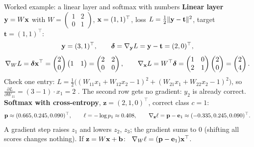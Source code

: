 \documentclass[aspectratio=1610,11pt]{beamer}
\begin{document}
\begin{frame}{Worked example: a linear layer and softmax with numbers}
    \small
    \textbf{Linear layer} $\mathbf{y} = W\mathbf{x}$ with $W = \begin{pmatrix} 1 & 2 \\ 0 & 1 \end{pmatrix}$, $\mathbf{x} = (1, 1)^\top$, loss $L = \frac{1}{2}\lVert \mathbf{y} - \mathbf{t} \rVert^2$, target $\mathbf{t} = (1, 1)^\top$:
    \[\mathbf{y} = (3, 1)^\top, \qquad \boldsymbol{\delta} = \nabla_{\mathbf{y}}L = \mathbf{y} - \mathbf{t} = (2, 0)^\top,\]
    \[\nabla_WL = \boldsymbol{\delta}\mathbf{x}^\top = \begin{pmatrix} 2 \\ 0 \end{pmatrix}\begin{pmatrix} 1 & 1 \end{pmatrix} = \begin{pmatrix} 2 & 2 \\ 0 & 0 \end{pmatrix}, \qquad \nabla_{\mathbf{x}}L = W^\top\boldsymbol{\delta} = \begin{pmatrix} 1 & 0 \\ 2 & 1 \end{pmatrix}\begin{pmatrix} 2 \\ 0 \end{pmatrix} = \begin{pmatrix} 2 \\ 4 \end{pmatrix}.\]
    Check one entry: $L = \frac{1}{2}\big((W_{11}x_1 + W_{12}x_2 - 1)^2 + (W_{21}x_1 + W_{22}x_2 - 1)^2\big)$, so $\frac{\partial L}{\partial W_{11}} = (3 - 1) \cdot x_1 = 2$ \checkmark. The second row gets no gradient: $y_2$ is already correct.
    \\[0.5em]
    \textbf{Softmax with cross-entropy}, $\mathbf{z} = (2, 1, 0)^\top$, correct class $c = 1$:
    \[\mathbf{p} \approx (0.665, 0.245, 0.090)^\top, \qquad \ell = -\log p_1 \approx 0.408, \qquad \nabla_{\mathbf{z}}\ell = \mathbf{p} - \mathbf{e}_1 \approx (-0.335, 0.245, 0.090)^\top.\]
    A gradient step raises $z_1$ and lowers $z_2$, $z_3$; the gradient sums to $0$ (shifting all scores changes nothing). If $\mathbf{z} = W\mathbf{x} + \mathbf{b}$: \ $\nabla_W\ell = (\mathbf{p} - \mathbf{e}_1)\mathbf{x}^\top$.
\end{frame}
\end{document}
